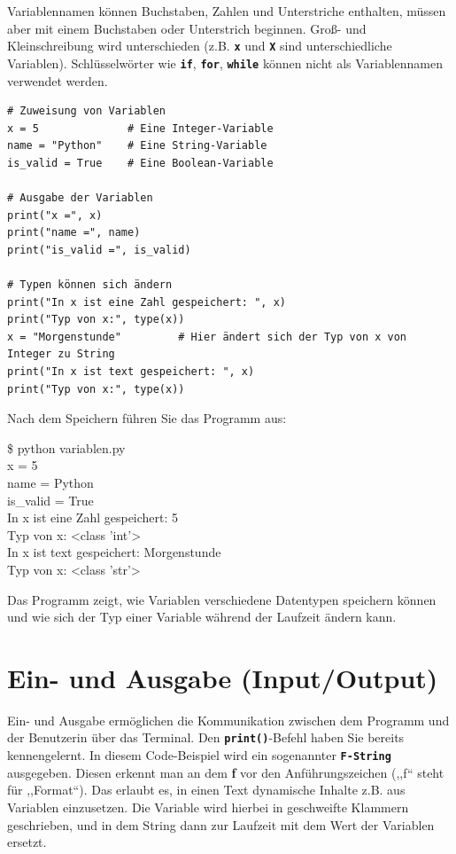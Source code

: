 \documentclass[ngerman,11pt]{article}
\begin{document}
Variablennamen können Buchstaben, Zahlen und Unterstriche enthalten, müssen aber mit einem Buchstaben oder Unterstrich beginnen. Groß- und Kleinschreibung wird unterschieden (z.B. \textbf{\texttt{x}} und \textbf{\texttt{X}} sind unterschiedliche Variablen). Schlüsselwörter wie \textbf{\texttt{if}}, \textbf{\texttt{for}}, \textbf{\texttt{while}} können nicht als Variablennamen verwendet werden.

\begin{lstlisting}[caption=variablen.py]
# Zuweisung von Variablen
x = 5              # Eine Integer-Variable
name = "Python"    # Eine String-Variable
is_valid = True    # Eine Boolean-Variable

# Ausgabe der Variablen
print("x =", x)
print("name =", name)
print("is_valid =", is_valid)

# Typen können sich ändern
print("In x ist eine Zahl gespeichert: ", x)
print("Typ von x:", type(x))
x = "Morgenstunde"         # Hier ändert sich der Typ von x von Integer zu String
print("In x ist text gespeichert: ", x)
print("Typ von x:", type(x))
\end{lstlisting}

Nach dem Speichern führen Sie das Programm aus:

\begin{tcolorbox}[colback=gray!15, fontupper=\ttfamily, boxrule=0.5pt,
    left=3mm, right=3mm, top=2mm, bottom=2mm]
\$ python variablen.py\\
x = 5\\
name = Python\\
is\_valid = True\\
In x ist eine Zahl gespeichert:  5\\
Typ von x: <class 'int'>\\
In x ist text gespeichert:  Morgenstunde\\
Typ von x: <class 'str'>
\end{tcolorbox}

\noindent Das Programm zeigt, wie Variablen verschiedene Datentypen speichern können und wie sich der Typ einer Variable während der Laufzeit ändern kann.

\section{Ein- und Ausgabe (Input/Output)}
Ein- und Ausgabe ermöglichen die Kommunikation zwischen dem Programm und der Benutzerin über das Terminal. Den \textbf{\texttt{print()}}-Befehl haben Sie bereits kennengelernt. In diesem Code-Beispiel wird ein sogenannter \textbf{\texttt{F-String}} ausgegeben. Diesen erkennt man an dem \textbf{f} vor den Anführungszeichen (,,f`` steht für ,,Format``). Das erlaubt es, in einen Text dynamische Inhalte z.B. aus Variablen einzusetzen. Die Variable wird hierbei in geschweifte Klammern geschrieben, und in dem String dann zur Laufzeit mit dem Wert der Variablen ersetzt.
\end{document}
